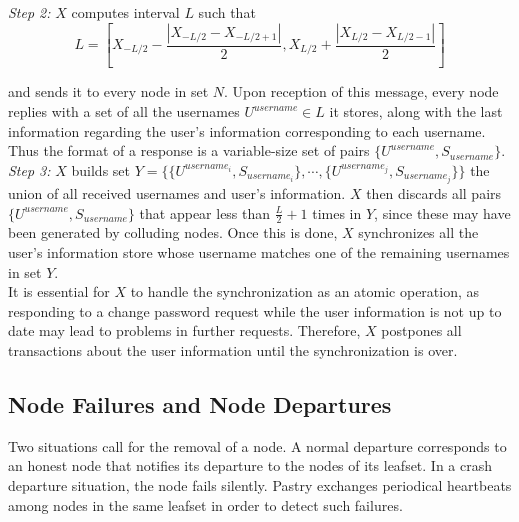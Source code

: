\textit{Step 2:} $X$ computes interval $L$ such that
$$
L = [ X_{-L/2} - \frac{| X_{-L/2} - X_{-L/2 +1} |}{2}, X_{L/2} +\frac{|
X_{L/2} - X_{L/2 -1} |}{2} ]
$$


and sends it to every node in set $N$. Upon reception of this message, every
node replies with a set of all the usernames $U^{username} \in L$ it
stores, along with the last information regarding the user's
information corresponding to each username. Thus the format of a response is a
variable-size set of pairs $\{ U^{username}, S_{username}\}$.\\


\textit{Step 3:} $X$ builds set 
$Y =  \{ \{U^{username_i}, S_{username_i}\},\cdots,\{ U^{username_j},
S_{username_j}\} \} $ the union of all received usernames and user's
information. $X$ then discards all pairs $\{ U^{username}, S_{username}\}$ that
appear less than $\frac{L}{2} +1$ times in $Y$, since these may have been
generated by colluding nodes. Once this is done, $X$ synchronizes all the
user's information store whose username matches one of the remaining usernames
in set $Y$.\\


It is essential for $X$ to handle the synchronization as an atomic operation,
as responding to a change password request while the user information is not up
to date may lead to problems in further requests. Therefore, $X$ postpones all
transactions about the user information until the synchronization is over.


\subsection{Node Failures and Node Departures}
\label{sec:node_failures_and_departures}
Two situations call for the removal of a node. A normal departure corresponds
to an honest node that notifies its departure to the nodes of its leafset. In a
crash departure situation, the node fails silently. Pastry exchanges
periodical heartbeats among nodes in the same leafset in order to detect such
failures.\\

